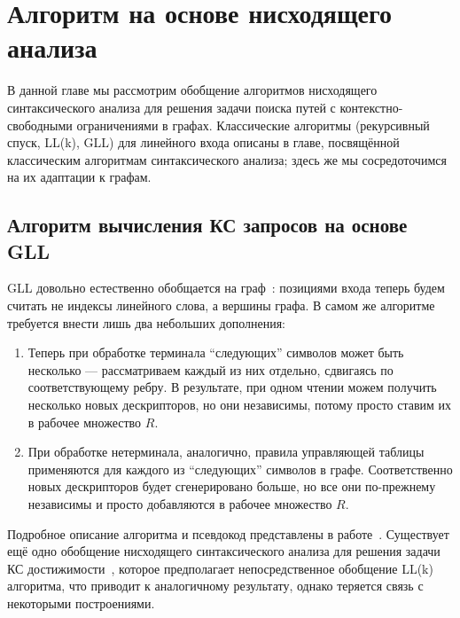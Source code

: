 \chapter{Алгоритм на основе нисходящего анализа}
В данной главе мы рассмотрим обобщение алгоритмов нисходящего синтаксического анализа для решения задачи поиска путей с контекстно-свободными ограничениями в графах.
Классические алгоритмы (рекурсивный спуск, LL(k), GLL) для линейного входа описаны в главе, посвящённой классическим алгоритмам синтаксического анализа; здесь же мы сосредоточимся на их адаптации к графам.

\section{Алгоритм вычисления КС запросов на основе GLL}

GLL довольно естественно обобщается на граф~\cite{Grigorev:2017:CPQ:3166094.3166104}: позициями входа теперь будем считать не индексы линейного слова, а вершины графа. В самом же алгоритме требуется внести лишь два небольших дополнения:

\begin{enumerate}
  \item Теперь при обработке терминала ``следующих'' символов может быть несколько --- рассматриваем каждый из них отдельно, сдвигаясь по соответствующему ребру. В результате, при одном чтении можем получить несколько новых дескрипторов, но они независимы, потому просто ставим их в рабочее множество $ R $.
  \item При обработке нетерминала, аналогично, правила управляющей таблицы применяются для каждого из ``следующих'' символов в графе. Соответственно новых дескрипторов будет сгенерировано больше, но все они по-прежнему независимы и просто добавляются в рабочее множество $ R $.
\end{enumerate}

Подробное описание алгоритма и псевдокод представлены в работе~\cite{Grigorev:2017:CPQ:3166094.3166104}. Существует ещё одно обобщение нисходящего синтаксического анализа для решения задачи КС достижимости~\cite{MEDEIROS201975}, которое предполагает непосредственное обобщение LL(k) алгоритма, что приводит к аналогичному результату, однако теряется связь с некоторыми построениями.

